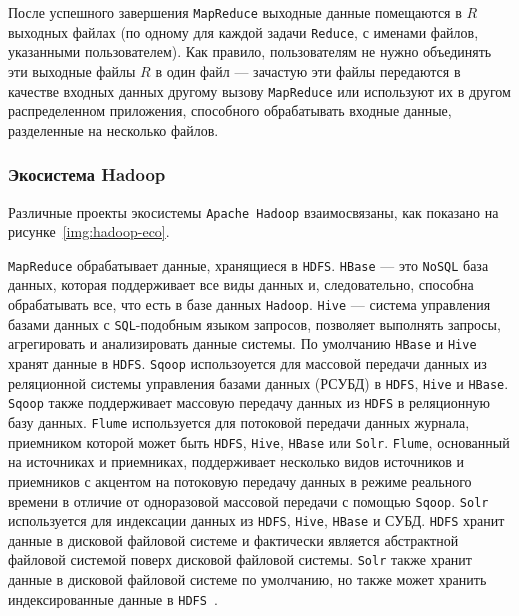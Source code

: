 После успешного завершения \texttt{MapReduce} выходные данные помещаются в $R$ выходных файлах (по одному для каждой задачи \texttt{Reduce}, с именами файлов, указанными пользователем).
Как правило, пользователям не нужно объединять эти выходные файлы $R$ в один файл --- зачастую эти файлы передаются в качестве входных данных другому вызову \texttt{MapReduce} или используют их в другом распределенном приложения, способного обрабатывать входные данные, разделенные на несколько файлов.

\subsubsection{Экосистема Hadoop}
 
Различные проекты экосистемы \texttt{Apache Hadoop} взаимосвязаны, как показано на рисунке~\ref{img:hadoop-eco}.


\texttt{MapReduce} обрабатывает данные, хранящиеся в \texttt{HDFS}. 
\texttt{HBase} --- это \texttt{NoSQL} база данных, которая поддерживает все виды данных и, следовательно, способна обрабатывать все, что есть в базе данных \texttt{Hadoop}. 
\texttt{Hive} --- система управления базами данных с \texttt{SQL}-подобным языком запросов, позволяет выполнять запросы, агрегировать и анализировать данные системы.
По умолчанию \texttt{HBase} и \texttt{Hive} хранят данные в \texttt{HDFS}. 
\texttt{Sqoop} использоуется для массовой передачи данных из реляционной системы управления базами данных (РСУБД) в \texttt{HDFS}, \texttt{Hive} и \texttt{HBase}. 
\texttt{Sqoop} также поддерживает массовую передачу данных из \texttt{HDFS} в реляционную базу данных. 
\texttt{Flume}  используется для потоковой передачи данных журнала, приемником которой может быть \texttt{HDFS}, \texttt{Hive}, \texttt{HBase} или \texttt{Solr}.
\texttt{Flume}, основанный на источниках и приемниках, поддерживает несколько видов источников и приемников с акцентом на потоковую передачу данных в режиме реального времени в отличие от одноразовой массовой передачи с помощью \texttt{Sqoop}. 
\texttt{Solr} используется для индексации данных из \texttt{HDFS}, \texttt{Hive}, \texttt{HBase} и СУБД. 
\texttt{HDFS} хранит данные в дисковой файловой системе и фактически является абстрактной файловой системой поверх дисковой файловой системы. 
\texttt{Solr} также хранит данные в дисковой файловой системе по умолчанию, но также может хранить индексированные данные в \texttt{HDFS}~\cite{vohra2016practical}.

